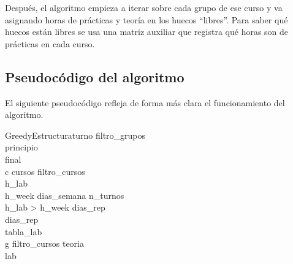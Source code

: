
Después, el algoritmo empieza a iterar sobre cada grupo de ese curso y va asignando horas de prácticas y teoría en los huecos ``libres''. Para saber qué huecos están libres se usa una matriz auxiliar que registra qué horas son de prácticas en cada curso.

\subsection{Pseudocódigo del algoritmo}
El siguiente pseudocódigo refleja de forma más clara el funcionamiento del algoritmo.

\newpage
\begin{pseudocode}{GreedyEstructura}{turno}
\label{greedyestructura}
filtro\_grupos \GETS {}\\
principio \GETS {}\\
final \GETS {}\\
\FOREACH c \in cursos \DO
\BEGIN
    filtro\_cursos \GETS {}\\
    h\_lab \GETS {}\\
    h\_week \GETS dias\_semana \cdot n\_turnos\\

    \IF h\_lab > h\_week \THEN
	    	dias\_rep \GETS {}\\
    \ELSE 
      dias\_rep \GETS \emptyset\\

   	tabla\_lab \GETS {}\\

   	\FOREACH g \in filtro\_cursos \DO
   	\BEGIN
   		teoria \GETS {}\\
   		lab \GETS {}\\


\end{pseudocode}
